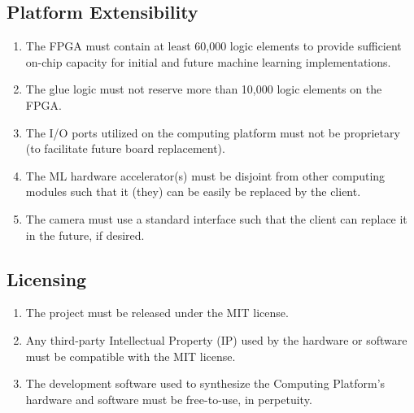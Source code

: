 \documentclass[10pt,letterpaper]{article}
\begin{document}
\subsection{Platform Extensibility}
\begin{enumerate}[label=C.EX.\arabic*, wide=1cm, widest=3cm, leftmargin=*, font=\bfseries, noitemsep,topsep=0pt, parsep=4pt, partopsep=0pt]
    \item The FPGA must contain at least 60,000 logic elements to provide sufficient on-chip capacity for initial and future machine learning implementations.
    \item The glue logic must not reserve more than 10,000 logic elements on the FPGA.
    \item The I/O ports utilized on the computing platform must not be proprietary (to facilitate future board replacement).
    \item The ML hardware accelerator(s) must be disjoint from other computing modules such that it (they) can be easily be replaced by the client.
    \item The camera must use a standard interface such that the client can replace it in the future, if desired.
\end{enumerate}

\subsection{Licensing}
\begin{enumerate}[label=C.LI.\arabic*, wide=1cm, widest=3cm, leftmargin=*, font=\bfseries, noitemsep,topsep=0pt, parsep=4pt, partopsep=0pt]
    \item The project must be released under the MIT license.
    \item Any third-party Intellectual Property (IP) used by the hardware or software must be compatible with the MIT license.
    \item The development software used to synthesize the Computing Platform's hardware and software must be free-to-use, in perpetuity.
\end{enumerate}
\end{document}
